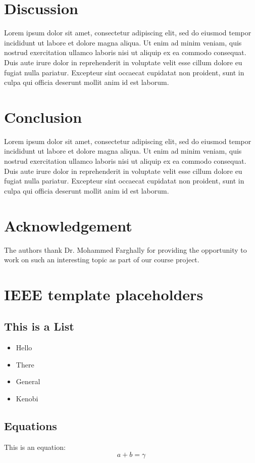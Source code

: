 \documentclass[conference]{IEEEtran}
\begin{document}
\section{Discussion}
Lorem ipsum dolor sit amet, consectetur adipiscing elit, sed do eiusmod tempor incididunt ut labore et dolore magna aliqua. Ut enim ad minim veniam, quis nostrud exercitation ullamco laboris nisi ut aliquip ex ea commodo consequat. Duis aute irure dolor in reprehenderit in voluptate velit esse cillum dolore eu fugiat nulla pariatur. Excepteur sint occaecat cupidatat non proident, sunt in culpa qui officia deserunt mollit anim id est laborum.

\section{Conclusion}
Lorem ipsum dolor sit amet, consectetur adipiscing elit, sed do eiusmod tempor incididunt ut labore et dolore magna aliqua. Ut enim ad minim veniam, quis nostrud exercitation ullamco laboris nisi ut aliquip ex ea commodo consequat. Duis aute irure dolor in reprehenderit in voluptate velit esse cillum dolore eu fugiat nulla pariatur. Excepteur sint occaecat cupidatat non proident, sunt in culpa qui officia deserunt mollit anim id est laborum.

\section{Acknowledgement}
The authors thank Dr. Mohammed Farghally for providing the opportunity to work on such an interesting topic as part of our course project.


\section{IEEE template placeholders}
\subsection{This is a List}
\begin{itemize}
\item Hello
\item There
\item General
\item Kenobi
\end{itemize}

\subsection{Equations}
This is an equation:
\begin{equation}
a+b=\gamma\label{eq}
\end{equation}
\end{document}
